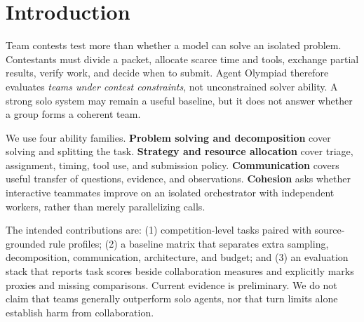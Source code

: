 \section{Introduction}
Team contests test more than whether a model can solve an isolated problem.
Contestants must divide a packet, allocate scarce time and tools, exchange
partial results, verify work, and decide when to submit. Agent Olympiad
therefore evaluates \emph{teams under contest constraints}, not unconstrained
solver ability. A strong solo system may remain a useful baseline, but it does
not answer whether a group forms a coherent team.

We use four ability families. \textbf{Problem solving and decomposition}
cover solving and splitting the task. \textbf{Strategy and resource
allocation} cover triage, assignment, timing, tool use, and submission policy.
\textbf{Communication} covers useful transfer of questions, evidence, and
observations. \textbf{Cohesion} asks whether interactive teammates improve on
an isolated orchestrator with independent workers, rather than merely
parallelizing calls.

The intended contributions are: (1) competition-level tasks paired with
source-grounded rule profiles; (2) a baseline matrix that separates extra
sampling, decomposition, communication, architecture, and budget; and (3) an
evaluation stack that reports task scores beside collaboration measures and
explicitly marks proxies and missing comparisons. Current evidence is
preliminary. We do not claim that teams generally outperform solo agents, nor
that turn limits alone establish harm from collaboration.

